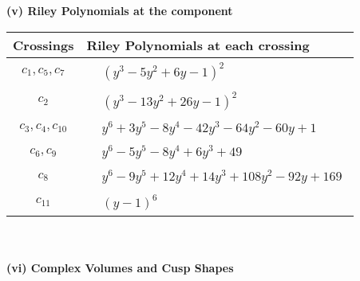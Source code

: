 \documentclass[1p]{elsarticle_modified}
\theoremstyle{definition}
\begin{document}
\newpage\renewcommand{\arraystretch}{1}
\flushleft \textbf{(v) Riley Polynomials at the component}\newline \\
\begin{tabular}{m{50pt}|m{274pt}}
Crossings & \hspace{64pt}Riley Polynomials at each crossing \\
\hline $$\begin{aligned}c_{1},c_{5},c_{7}\end{aligned}$$&$\begin{aligned}
&(y^3-5 y^2+6 y-1)^2
\end{aligned}$\\
\hline $$\begin{aligned}c_{2}\end{aligned}$$&$\begin{aligned}
&(y^3-13 y^2+26 y-1)^2
\end{aligned}$\\
\hline $$\begin{aligned}c_{3},c_{4},c_{10}\end{aligned}$$&$\begin{aligned}
&y^6+3 y^5-8 y^4-42 y^3-64 y^2-60 y+1
\end{aligned}$\\
\hline $$\begin{aligned}c_{6},c_{9}\end{aligned}$$&$\begin{aligned}
&y^6-5 y^5-8 y^4+6 y^3+49
\end{aligned}$\\
\hline $$\begin{aligned}c_{8}\end{aligned}$$&$\begin{aligned}
&y^6-9 y^5+12 y^4+14 y^3+108 y^2-92 y+169
\end{aligned}$\\
\hline $$\begin{aligned}c_{11}\end{aligned}$$&$\begin{aligned}
&(y-1)^6
\end{aligned}$\\
\hline
\end{tabular}\\~\\
\newpage\flushleft \textbf{(vi) Complex Volumes and Cusp Shapes}
\end{document}
